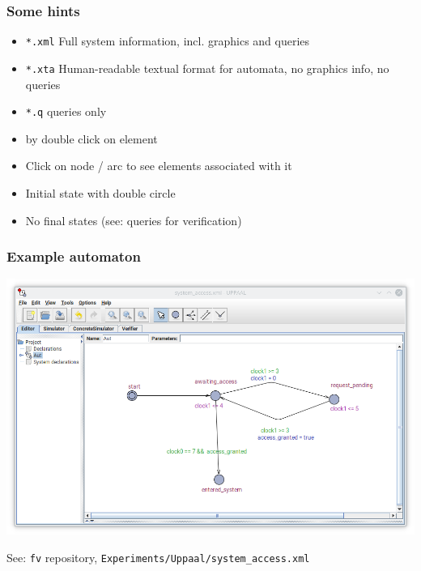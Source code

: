 \documentclass{beamer}
\begin{document}
\begin{frame}[fragile]\frametitle{Some hints}

  \begin{itemize}
  \item \texttt{*.xml} Full system information, incl.{} graphics and queries
  \item \texttt{*.xta} Human-readable textual format for automata, no graphics
    info, no queries
  \item \texttt{*.q} queries only
  \end{itemize}

  \begin{itemize}
  \item by double click on element
  \end{itemize}

  \begin{itemize}
  \item Click on node / arc to see elements associated with it
  \end{itemize}

  \begin{itemize}
  \item Initial state with double circle
  \item No final states (see: queries for verification)
  \end{itemize}
  
\end{frame}

\begin{frame}[fragile]\frametitle{Example automaton}

  \begin{center}
    \includegraphics[scale=0.4]{Figures/system_access_automaton.png}
  \end{center}

  See: \texttt{fv} repository,  \texttt{Experiments/Uppaal/system\_access.xml}
\end{frame}
\end{document}
